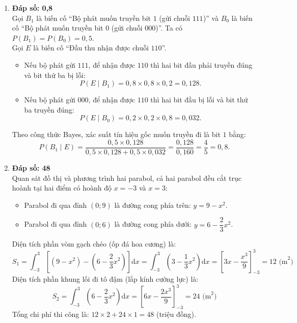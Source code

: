 \documentclass[12pt,a4paper]{article}
\begin{document}
\begin{enumerate}[label=\textbf{Câu \arabic*:}, leftmargin=*]
\item \textbf{Đáp số: 0,8}\\
Gọi $B_1$ là biến cố ``Bộ phát muốn truyền bit $1$ (gửi chuỗi $111$)'' và $B_0$ là biến cố ``Bộ phát muốn truyền bit $0$ (gửi chuỗi $000$)''. Ta có $P(B_1) = P(B_0) = 0{,}5$.\\
Gọi $E$ là biến cố ``Đầu thu nhận được chuỗi $110$''.
\begin{itemize}
    \item Nếu bộ phát gửi $111$, để nhận được $110$ thì hai bit đầu phải truyền đúng và bit thứ ba bị lỗi:
    $$P(E \mid B_1) = 0{,}8 \times 0{,}8 \times 0{,}2 = 0{,}128.$$
    \item Nếu bộ phát gửi $000$, để nhận được $110$ thì hai bit đầu bị lỗi và bit thứ ba truyền đúng:
    $$P(E \mid B_0) = 0{,}2 \times 0{,}2 \times 0{,}8 = 0{,}032.$$
\end{itemize}
Theo công thức Bayes, xác suất tín hiệu gốc muốn truyền đi là bit $1$ bằng:
$$P(B_1 \mid E) = \dfrac{0{,}5 \times 0{,}128}{0{,}5 \times 0{,}128 + 0{,}5 \times 0{,}032} = \dfrac{0{,}128}{0{,}160} = \dfrac{4}{5} = 0{,}8.$$

\item \textbf{Đáp số: 48}\\
Quan sát đồ thị và phương trình hai parabol, cả hai parabol đều cắt trục hoành tại hai điểm có hoành độ $x = -3$ và $x = 3$:
\begin{itemize}
    \item Parabol đi qua đỉnh $(0; 9)$ là đường cong phía trên: $y = 9 - x^2$.
    \item Parabol đi qua đỉnh $(0; 6)$ là đường cong phía dưới: $y = 6 - \dfrac{2}{3}x^2$.
\end{itemize}
Diện tích phần vòm gạch chéo (ốp đá hoa cương) là:
$$S_1 = \int_{-3}^{3} \left[(9 - x^2) - \left(6 - \dfrac{2}{3}x^2\right)\right]\mathrm{d}x = \int_{-3}^{3} \left(3 - \dfrac{1}{3}x^2\right)\mathrm{d}x = \left[3x - \dfrac{x^3}{9}\right]_{-3}^{3} = 12\text{ (m}^2\text{)}$$
Diện tích phần khung lối đi tô đậm (lắp kính cường lực) là:
$$S_2 = \int_{-3}^{3} \left(6 - \dfrac{2}{3}x^2\right)\mathrm{d}x = \left[6x - \dfrac{2x^3}{9}\right]_{-3}^{3} = 24\text{ (m}^2\text{)}$$
Tổng chi phí thi công là: $12 \times 2 + 24 \times 1 = 48$ (triệu đồng).

\end{enumerate}
\end{document}
